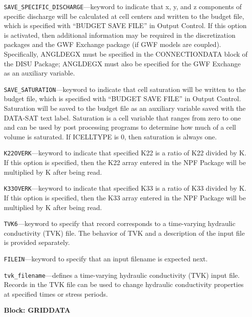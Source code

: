 \begin{description}
\item \texttt{SAVE\_SPECIFIC\_DISCHARGE}---keyword to indicate that x, y, and z components of specific discharge will be calculated at cell centers and written to the budget file, which is specified with ``BUDGET SAVE FILE'' in Output Control.  If this option is activated, then additional information may be required in the discretization packages and the GWF Exchange package (if GWF models are coupled).  Specifically, ANGLDEGX must be specified in the CONNECTIONDATA block of the DISU Package; ANGLDEGX must also be specified for the GWF Exchange as an auxiliary variable.

\item \texttt{SAVE\_SATURATION}---keyword to indicate that cell saturation will be written to the budget file, which is specified with ``BUDGET SAVE FILE'' in Output Control.  Saturation will be saved to the budget file as an auxiliary variable saved with the DATA-SAT text label.  Saturation is a cell variable that ranges from zero to one and can be used by post processing programs to determine how much of a cell volume is saturated.  If ICELLTYPE is 0, then saturation is always one.

\item \texttt{K22OVERK}---keyword to indicate that specified K22 is a ratio of K22 divided by K.  If this option is specified, then the K22 array entered in the NPF Package will be multiplied by K after being read.

\item \texttt{K33OVERK}---keyword to indicate that specified K33 is a ratio of K33 divided by K.  If this option is specified, then the K33 array entered in the NPF Package will be multiplied by K after being read.

\item \texttt{TVK6}---keyword to specify that record corresponds to a time-varying hydraulic conductivity (TVK) file.  The behavior of TVK and a description of the input file is provided separately.

\item \texttt{FILEIN}---keyword to specify that an input filename is expected next.

\item \texttt{tvk\_filename}---defines a time-varying hydraulic conductivity (TVK) input file.  Records in the TVK file can be used to change hydraulic conductivity properties at specified times or stress periods.

\end{description}
\item \textbf{Block: GRIDDATA}

